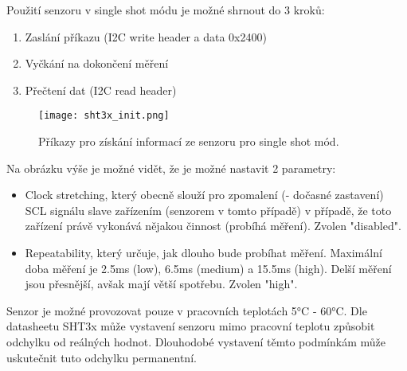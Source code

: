 Použití senzoru v single shot módu je možné shrnout do 3 kroků:
\begin{enumerate}
	\item Zaslání příkazu (I2C write header a data 0x2400)
	\item Vyčkání na dokončení měření
	\item Přečtení dat (I2C read header)
\end{enumerate}

\begin{figure}[h!]
	\centering
	\texttt{[image: sht3x\_init.png]}
	\caption{Příkazy pro získání informací ze senzoru pro single shot mód. \cite{sht3x-doc}}
\end{figure}

\newpage

Na obrázku výše je možné vidět, že je možné nastavit 2 parametry:
\begin{itemize}
	\item Clock stretching, který obecně slouží pro zpomalení (- dočasné zastavení) SCL signálu slave zařízením
	(senzorem v tomto případě) v případě, že toto zařízení právě vykonává nějakou činnost
	(probíhá měření). Zvolen "disabled".
	\item Repeatability, který určuje, jak dlouho bude probíhat měření.
	Maximální doba měření je 2.5ms (low), 6.5ms (medium) a 15.5ms (high).
	Delší měření jsou přesnější, avšak mají větší spotřebu.
	Zvolen "high".
\end{itemize}

Senzor je možné provozovat pouze v pracovních teplotách 5°C - 60°C.
Dle datasheetu SHT3x \cite{sht3x-doc} může vystavení senzoru mimo
pracovní teplotu způsobit odchylku od reálných hodnot.
Dlouhodobé vystavení těmto podmínkám může uskutečnit tuto odchylku permanentní.
